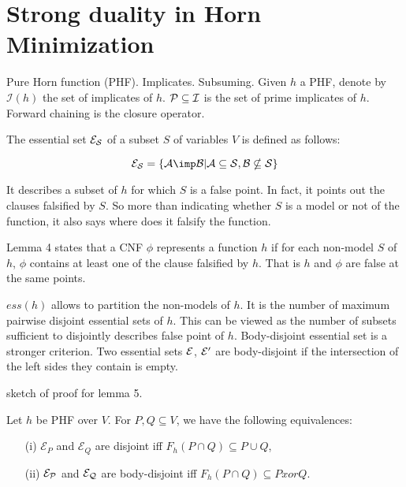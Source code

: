 \section{Strong duality in Horn Minimization}

Pure Horn function (PHF). Implicates. Subsuming. Given $h$ a PHF, denote by 
$\mathcal{I}(h)$ the set of implicates of $h$. $\cal{P} \subseteq \cal{I}$ is
the set of prime implicates of $h$. Forward chaining is the closure operator. 

The essential set $\cal{E}_S$ of a subset $S$ of variables $V$ is defined as
follows:

	\[ \cal{E}_S = \{ A \imp B | A \subseteq S, B \nsubseteq S \} \]
	
It describes a subset of $h$ for which $S$ is a false point. In fact, it points
out the clauses falsified by $S$. So more than indicating whether $S$ is a model
or not of the function, it also says where does it falsify the function.

Lemma 4 states that a CNF $\phi$ represents a function $h$ if for each non-model
$S$ of $h$, $\phi$ contains at least one of the clause falsified by $h$. That is
$h$ and $\phi$ are false at the same points.

$ess(h)$ allows to partition the non-models of $h$. It is the number of maximum
pairwise disjoint essential sets of $h$. This can be viewed as the number of
subsets sufficient to disjointly describes false point of $h$. Body-disjoint 
essential set is a stronger criterion. Two essential sets $\cal{E}$, $\cal{E}'$
are body-disjoint if the intersection of the left sides they contain is empty.

sketch of proof for lemma 5. 

\begin{lemma} Let $h$ be PHF over $V$. For $P, Q \subseteq V$, we have the 
following equivalences:

\begin{itemize}
	\item[(i)] $\mathcal{E}_P$ and $\mathcal{E}_Q$ are disjoint iff $F_h(P \cap
		Q) \subseteq P \cup Q$,
	
	\item[(ii)] $\cal{E}_P$ and $\cal{E}_Q$ are body-disjoint iff $F_h(P
	 	\cap Q) \subseteq P xor Q$.
\end{itemize}
	
\end{lemma} 

